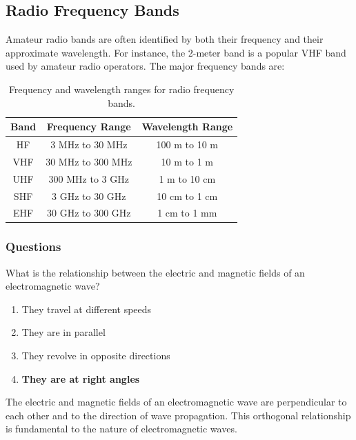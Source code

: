 \subsection{Radio Frequency Bands}
Amateur radio bands are often identified by both their frequency and their approximate wavelength. For instance, the 2-meter band is a popular VHF band used by amateur radio operators. The major frequency bands are:

\begin{table}[h]
    \centering
    \begin{tabular}{|c|c|c|}
        \hline
        \textbf{Band} & \textbf{Frequency Range} & \textbf{Wavelength Range} \\
        \hline
        HF & 3 MHz to 30 MHz & 100 m to 10 m \\
        VHF & 30 MHz to 300 MHz & 10 m to 1 m \\
        UHF & 300 MHz to 3 GHz & 1 m to 10 cm \\
        SHF & 3 GHz to 30 GHz & 10 cm to 1 cm \\
        EHF & 30 GHz to 300 GHz & 1 cm to 1 mm \\
        \hline
    \end{tabular}
    \caption{Frequency and wavelength ranges for radio frequency bands.}
    \label{tab:frequency-ranges}
\end{table}

\subsubsection{Questions}

\begin{tcolorbox}[colback=gray!10!white,colframe=black!75!black,title={T3B01}]
What is the relationship between the electric and magnetic fields of an electromagnetic wave?
\begin{enumerate}[label=\Alph*),noitemsep]
    \item They travel at different speeds
    \item They are in parallel
    \item They revolve in opposite directions
    \item \textbf{They are at right angles}
\end{enumerate}
\end{tcolorbox}

The electric and magnetic fields of an electromagnetic wave are perpendicular to each other and to the direction of wave propagation. This orthogonal relationship is fundamental to the nature of electromagnetic waves.

